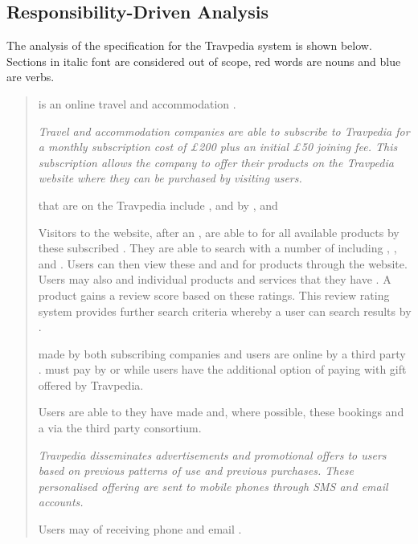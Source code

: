 \subsection{Responsibility-Driven Analysis }

The analysis of the specification for the Travpedia system is shown below.
Sections in italic font are considered out of scope, red words
are nouns and blue are verbs.

\begin{quote}
	 is an online travel and accommodation .

	\emph{Travel and accommodation companies are able to subscribe to Travpedia
	for a monthly subscription cost of £200 plus an initial £50 joining fee.
	This subscription allows the company to offer their products on the
	Travpedia website where they can be purchased by visiting users.}

	 that are  on the Travpedia
	 include ,  and
	 by ,  and 

	Visitors to the website, after  an , are
	able to  for all available products  by these
	subscribed . They are able to search with a number of
	 including , ,
	 and . Users can then view these  and  and  for products through the website.
	Users may also  and  individual products and
	services that they have . A product gains a review score
	based on these ratings. This review rating system provides further search
	criteria whereby a user can  search results by .

	 made by both subscribing companies and users are
	 online by a third party .
	 must pay by  or  while
	users have the additional option of paying with gift 
	offered by Travpedia.

	Users are able to  they have made and, where
	possible,  these bookings and  a
	 via the third party consortium.

	\emph{Travpedia disseminates advertisements and promotional offers to users
	based on previous patterns of use and previous purchases.  These
	personalised offering are sent to mobile phones through SMS and email
	accounts.}

	Users may  of receiving phone and email .
\end{quote}

